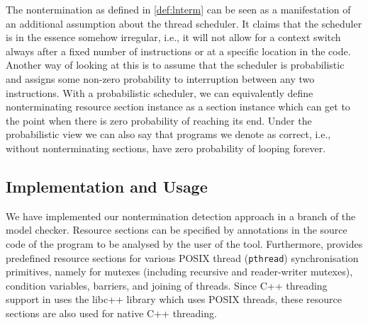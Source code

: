 The nontermination as defined in \autoref{def:lnterm} can be seen as a
manifestation of an additional assumption about the thread scheduler. It
claims that the scheduler is in the essence somehow irregular, i.e.,
it will not allow for a context switch always after a fixed number of
instructions or at a specific location in the code.  Another way of looking at
this is to assume that the scheduler is probabilistic and assigns some non-zero
probability to interruption between any two instructions. %
With a probabilistic scheduler, we can equivalently define nonterminating
resource section instance as a section instance which can get to the point when
there is zero probability of reaching its end.  Under the probabilistic view we can
also say that programs we denote as correct, i.e., without nonterminating
sections, have zero probability of looping forever.



\subsection{Implementation and Usage}

We have implemented our nontermination detection approach in a branch of the \divine model checker.
Resource sections can be specified by annotations in the source code
of the program to be analysed by the user of the tool.
Furthermore, \divine provides predefined resource sections for various POSIX
thread (\texttt{pthread}) synchronisation primitives, namely for
 mutexes (including recursive and reader-writer mutexes), %
 condition variables, barriers, and joining of threads.
Since C++ threading support in \divine uses the libc++ library which uses POSIX threads, these resource sections are also used for native C++ threading.

